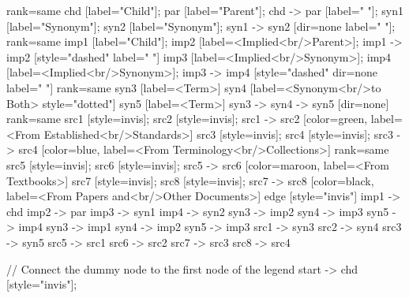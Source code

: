 \documentclass{article}
\begin{document}
{{    {
        rank=same
        chd [label="Child"];
        par [label="Parent"];
        chd -> par [label="                "];
        syn1 [label="Synonym"];
        syn2 [label="Synonym"];
        syn1 -> syn2 [dir=none label="                "];
    }
    {
        rank=same
        imp1 [label="Child"];
        imp2 [label=<Implied<br/>Parent>];
        imp1 -> imp2 [style="dashed" label="                "]
        imp3 [label=<Implied<br/>Synonym>];
        imp4 [label=<Implied<br/>Synonym>];
        imp3 -> imp4 [style="dashed" dir=none label="                "]
    }
    {
        rank=same
        syn3 [label=<Term>]
        syn4 [label=<Synonym<br/>to Both> style="dotted"]
        syn5 [label=<Term>]
        syn3 -> syn4 -> syn5 [dir=none]
    }
{
rank=same
src1 [style=invis];
src2 [style=invis];
src1 -> src2 [color=green, label=<From Established<br/>Standards>]
src3 [style=invis];
src4 [style=invis];
src3 -> src4 [color=blue, label=<From Terminology<br/>Collections>]
}
{
rank=same
src5 [style=invis];
src6 [style=invis];
src5 -> src6 [color=maroon, label=<From Textbooks>]
src7 [style=invis];
src8 [style=invis];
src7 -> src8 [color=black, label=<From Papers and<br/>Other Documents>]
}
edge [style="invis"]
imp1 -> chd
imp2 -> par
imp3 -> syn1
imp4 -> syn2
syn3 -> imp2
syn4 -> imp3
syn5 -> imp4
syn3 -> imp1
syn4 -> imp2
syn5 -> imp3
src1 -> syn3
src2 -> syn4
src3 -> syn5
src5 -> src1
src6 -> src2
src7 -> src3
src8 -> src4
}

// Connect the dummy node to the first node of the legend
start -> chd [style="invis"];
}
\end{document}
